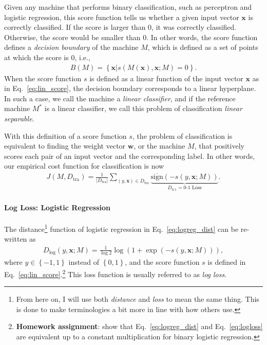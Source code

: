 \documentclass{report}
\newcommand{\vect}[1]{\mathbf{#1}}
\newcommand{\vx}[0]{\vect{x}}
\newcommand{\vw}[0]{\vect{w}}
\newcommand{\sign}{\text{sign}}
\begin{document}
Given any machine that performs binary classification, such as perceptron and
logistic regression, this score function tells us whether a given input vector
$\vx$ is correctly classified. If the score is larger than 0, it was correctly
classified. Otherwise, the score would be smaller than 0. In other words, the
score function defines a {\it decision boundary} of the machine $M$, which is
defined as a set of points at which the score is $0$, i.e.,
\begin{align*}
    B(M) = \left\{ \vx | s(M(\vx), \vx; M) = 0 \right\}.
\end{align*}
When the score function $s$ is defined as a linear function of the input vector
$\vx$ as in Eq.~\eqref{eq:lin_score}, the decision boundary corresponds to a
linear hyperplane. In such a case, we call the machine a {\it linear
classifier}, and if the reference machine $M^*$ is a linear classifier, we call
this problem of classification {\it linear separable}.

With this definition of a score function $s$, the problem of classification is
equivalent to finding the weight vector $\vw$, or the machine $M$, that
positively scores each pair of an input vector and the corresponding label. In
other words, our empirical cost function for classification is now 
\begin{align}
    \label{eq:0-1_loss}
    J(M, D_{\text{tra}}) = \frac{1}{|D_{\text{tra}}|} \sum_{(y, \vx) \in D_{\text{tra}}} 
    \underbrace{\overline{\sign}(-s(y, \vx; M))}_{
        D_{\text{0-1}} = \text{0-1 Loss}
    }.
\end{align}

\paragraph{Log Loss: Logistic Regression}

The distance\footnote{
    From here on, I will use both {\it distance} and {\it loss} to mean the same
    thing. This is done to make terminologies a bit more in line with how
    others use.
}
function of logistic regression in Eq.~\eqref{eq:logreg_dist} can be re-written
as
\begin{align}
    \label{eq:logloss}
    D_{\log}(y, \vx; M) = \frac{1}{\log 2} \log(1+\exp(-s(y, \vx; M))),
\end{align}
where $y \in \left\{ -1, 1\right\}$ instead of $\left\{ 0, 1 \right\}$, and the
score function $s$ is defined in Eq.~\eqref{eq:lin_score}.\footnote{
    {\bf Homework assignment}: show that Eq.~\eqref{eq:logreg_dist} and
    Eq.~\eqref{eq:logloss} are equivalent up to a constant multiplication for
    binary logistic regression.
} This loss function is usually referred to as {\it log loss}.
\end{document}
